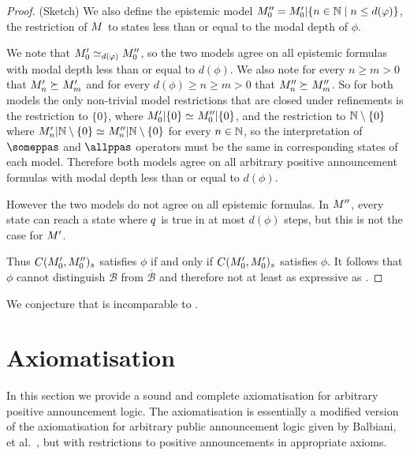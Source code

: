 \begin{proof}{(Sketch)}
We also define the epistemic model $\kPModel[\prime\prime]{0} = \restrict{\kPModelP{0}}{\{n \in \naturals \mid n \leq d(\phi)\}}$, the restriction of $\kModel$ to states less than or equal to the modal depth of $\phi$.

We note that $\kPModelP{0} \bisimilar[d(\phi)] \kPModel[\prime\prime]{0}$, so the two models agree on all epistemic formulas with modal depth less than or equal to $d(\phi)$.
We also note for every $n \geq m > 0$ that $\kPModelP{n} \simulates \kPModelP{m}$ and for every $d(\phi) \geq n \geq m > 0$ that $\kPModel[\prime\prime]{n} \simulates \kPModel[\prime\prime]{m}$.
So for both models the only non-trivial model restrictions that are closed under refinements is the restriction to $\{0\}$, where $\restrict{\kPModelP{0}}{\{0\}} \bisimilar \restrict{\kPModel[\prime\prime]{0}}{\{0\}}$, and the restriction to $\naturals \setminus \{0\}$ where $\restrict{\kPModelP{n}}{\naturals \setminus \{0\}} \bisimilar \restrict{\kPModel[\prime\prime]{n}}{\naturals \setminus \{0\}}$ for every $n \in \naturals$, so the interpretation of $\someppas$ and $\allppas$ operators must be the same in corresponding states of each model.
Therefore both models agree on all arbitrary positive announcement formulas with modal depth less than or equal to $d(\phi)$.

However the two models do not agree on all epistemic formulas.
In $\kModel[\prime\prime]$, every state can reach a state where $\atomQ$ is true in at most $d(\phi)$ steps, but this is not the case for $\kModelP$.

Thus $C(\kPModelP{0}, \kPModel[\prime\prime]{0})_{\kStateS}$ satisfies $\phi$ if and only if $C(\kPModelP{0}, \kPModelP{0})_{\kStateS}$ satisfies $\phi$.
It follows that $\phi$ cannot distinguish $\mathcal{B}$ from $\overline{\mathcal{B}}$ and therefore \logicPapalS{} not at least as expressive as \logicApalS{}.
\end{proof}

We conjecture that \logicPapalS{} is incomparable to \logicApalS{}.

\section{Axiomatisation}\label{papal-axiomatisation}

In this section we provide a sound and complete axiomatisation for arbitrary positive announcement logic.
The axiomatisation is essentially a modified version of the axiomatisation for arbitrary public announcement logic given by Balbiani, et al.~\cite{balbiani:2008,balbianietal.short:2014}, but with restrictions to positive announcements in appropriate axioms.

